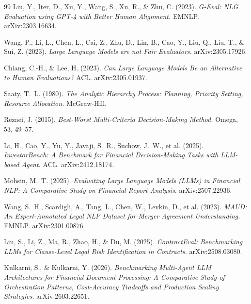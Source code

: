 \documentclass[11pt]{article}
\begin{document}
\begin{thebibliography}{99}
Liu, Y., Iter, D., Xu, Y., Wang, S., Xu, R., \& Zhu, C. (2023).
\textit{G-Eval: NLG Evaluation using GPT-4 with Better Human Alignment.} EMNLP. arXiv:2303.16634.

Wang, P., Li, L., Chen, L., Cai, Z., Zhu, D., Lin, B., Cao, Y., Liu, Q., Liu, T., \& Sui, Z. (2023).
\textit{Large Language Models are not Fair Evaluators.} arXiv:2305.17926.

Chiang, C.-H., \& Lee, H. (2023).
\textit{Can Large Language Models Be an Alternative to Human Evaluations?} ACL. arXiv:2305.01937.

Saaty, T.~L. (1980).
\textit{The Analytic Hierarchy Process: Planning, Priority Setting, Resource Allocation.} McGraw-Hill.

Rezaei, J. (2015).
\textit{Best-Worst Multi-Criteria Decision-Making Method.} Omega, 53, 49--57.

Li, H., Cao, Y., Yu, Y., Javaji, S.~R., Suchow, J.~W., et al. (2025).
\textit{InvestorBench: A Benchmark for Financial Decision-Making Tasks with LLM-based Agent.} ACL. arXiv:2412.18174.

Mohsin, M.~T. (2025).
\textit{Evaluating Large Language Models (LLMs) in Financial NLP: A Comparative Study on Financial Report Analysis.} arXiv:2507.22936.

Wang, S.~H., Scardigli, A., Tang, L., Chen, W., Levkin, D., et al. (2023).
\textit{MAUD: An Expert-Annotated Legal NLP Dataset for Merger Agreement Understanding.} EMNLP. arXiv:2301.00876.

Liu, S., Li, Z., Ma, R., Zhao, H., \& Du, M. (2025).
\textit{ContractEval: Benchmarking LLMs for Clause-Level Legal Risk Identification in Contracts.} arXiv:2508.03080.

Kulkarni, S., \& Kulkarni, Y. (2026).
\textit{Benchmarking Multi-Agent LLM Architectures for Financial Document Processing: A Comparative Study of Orchestration Patterns, Cost-Accuracy Tradeoffs and Production Scaling Strategies.} arXiv:2603.22651.

\end{thebibliography}
\end{document}
